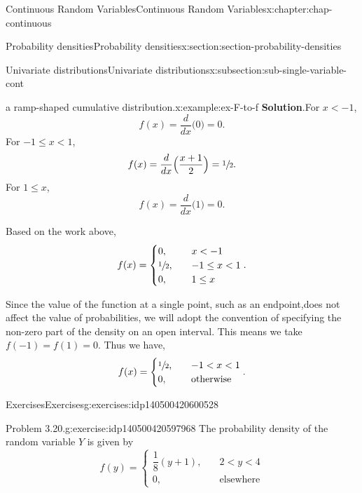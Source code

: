\documentclass[oneside,10pt,]{book}
\newcommand{\blocktitlefont}{\relax}
\newcommand{\lt}{<}
\newcommand{\amp}{&}
\begin{document}
\begin{chapterptx}{Continuous Random Variables}{}{Continuous Random Variables}{}{}{x:chapter:chap-continuous}
\begin{sectionptx}{Probability densities}{}{Probability densities}{}{}{x:section:section-probability-densities}
\begin{subsectionptx}{Univariate distributions}{}{Univariate distributions}{}{}{x:subsection:sub-single-variable-cont}
\begin{example}{a ramp-shaped cumulative distribution.}{x:example:ex-F-to-f}
\textbf{\blocktitlefont Solution}.\quad{}For \(x \lt -1\),%
\begin{equation*}
f(x) = \dfrac{d}{dx}\Big(0\Big) = 0\text{.}
\end{equation*}
For \(-1 \le x \lt 1\),%
\begin{equation*}
f(x) =
\dfrac{d}{dx}\Big(\dfrac{x+1}{2}\Big) = \sfrac{1}{2}\text{.}
\end{equation*}
For \(1 \le x\),%
\begin{equation*}
f(x) = \dfrac{d}{dx}\Big(1\Big) = 0\text{.}
\end{equation*}
%
\par
Based on the work above,%
\begin{equation*}
f(x) = \begin{cases}0, \amp \quad x \lt
-1\\\sfrac{1}{2}, \amp \quad -1 \le x \lt 1\\ 0, \amp \quad 1 \le
x\end{cases}\text{.}
\end{equation*}
%
\par
Since the value of the function at a single point, such as an endpoint,does not affect the value of probabilities, we will adopt the convention of specifying the non-zero part of the density on an open interval.  This means we take \(f(-1)=f(1)=0\). Thus we have,%
\begin{equation*}
f(x) = \begin{cases}\sfrac{1}{2}, \amp \quad -1 \lt x \lt 1\\ 0,
\amp \quad
\text{otherwise}\end{cases}\text{.}
\end{equation*}
%
\end{example}
\end{subsectionptx}
%
%
\typeout{************************************************}
\typeout{************************************************}
%
\begin{exercises-subsection}{Exercises}{}{Exercises}{}{}{g:exercises:idp140500420600528}
\begin{divisionexercise}{1}{Problem 3.20.}{}{g:exercise:idp140500420597968}%
The probability density of the random variable \(Y\) is given by%
\begin{equation*}
f(y) = \begin{cases} \dfrac{1}{8}(y+1), \amp \quad 2 \lt y \lt 4\\
0, \amp \quad \text{elsewhere}\end{cases}

\end{equation*}
\end{divisionexercise}
\end{exercises-subsection}
\end{sectionptx}
\end{chapterptx}
\end{document}
